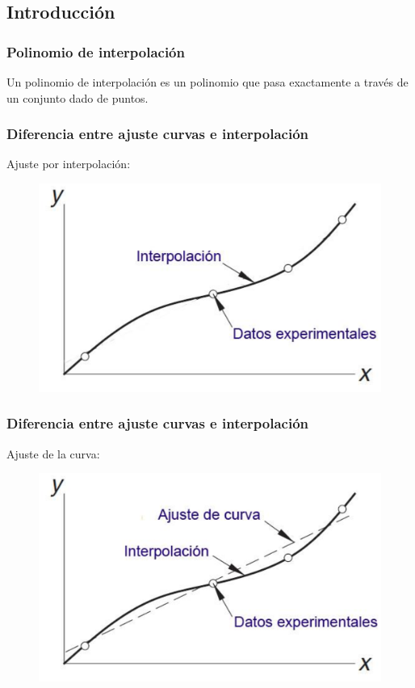 \documentclass[12pt]{beamer}
\begin{document}
\subsection{Introducción}

\begin{frame}
\frametitle{Polinomio de interpolación}
Un polinomio de interpolación es un polinomio que pasa exactamente a través de un conjunto dado de puntos.
\end{frame}
\begin{frame}
\frametitle{Diferencia entre ajuste curvas e interpolación}
Ajuste por interpolación:
\begin{figure}
   \centering
   \includegraphics[scale=0.5]{Imagenes/Interpol02.eps}
\end{figure}
\end{frame}
\begin{frame}
\frametitle{Diferencia entre ajuste curvas e interpolación}
Ajuste de la curva:
\begin{figure}
   \centering
   \includegraphics[scale=0.5]{Imagenes/Interpol03.eps}
\end{figure}
\end{frame}
\end{document}
